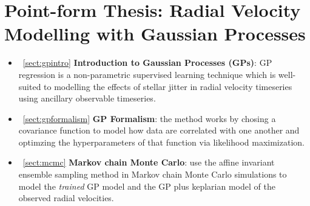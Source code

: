 \section{Point-form Thesis: Radial Velocity Modelling with Gaussian Processes}
\begin{itemize}
\renewcommand\labelitemi{--}
\item~\ref{sect:gpintro} \textbf{Introduction to Gaussian Processes (GPs)}: GP regression  
is a non-parametric supervised learning technique which is well-suited to modelling the 
effects of stellar jitter in radial velocity timeseries using ancillary observable timeseries.
\item~\ref{sect:gpformalism} \textbf{GP Formalism}: the method works by chosing a covariance 
function to model how data are correlated with one another and optimzing the hyperparameters 
of that function via likelihood maximization. 
\item~\ref{sect:mcmc} \textbf{Markov chain Monte Carlo}: use the affine invariant ensemble 
sampling method in Markov chain Monte Carlo simulations to model the \emph{trained} GP model 
and the GP plus keplarian model of the observed radial velocities.  
\end{itemize}
